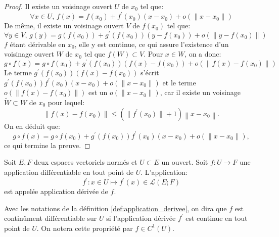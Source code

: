 \begin{proof}
  Il existe un voisinage ouvert $U$ de $x_0$ tel que:
  \begin{equation}
    \forall x \in U, \, f(x) = f(x_0) + f^\prime(x_0)\left( x-x_0 \right) + o\left( \| x - x_0 \| \right)
  \end{equation}
De même, il existe un voisinage ouvert $V$ de $f(x_0)$ tel que:
  \begin{equation}
    \forall y \in V, \, g(y) = g\left( f(x_0) \right)+ g^\prime\left( f(x_0) \right)\left( y-f(x_0) \right) + o\left( \| y - f(x_0) \| \right)
  \end{equation}
  $f$ étant dérivable en $x_0$, elle y est continue, ce qui assure l'existence d'un voisinage ouvert $W$ de $x_0$ tel que $f(W) \subset V.$ 
Pour $x \in W$, on a donc:
\begin{equation}
  g \circ f (x) = g \circ f (x_0) +g^\prime \left( f(x_0) \right)\left( f(x)-f(x_0) \right) + o\left( \| f(x) - f(x_0) \| \right)
\end{equation}
Le terme $g^\prime \left( f(x_0) \right)\left( f(x)-f(x_0) \right)$ s'écrit $g^\prime \left( f(x_0) \right)f^\prime(x_0)\left( x-x_0 \right)
+ o\left( \| x-x_0\| \right)$ et le terme $o\left( \| f(x) - f(x_0) \| \right)$ est un $o\left( \| x-x_0\| \right)$, car il existe un 
voisinage $\tilde{W} \subset W$ de $x_0$ pour lequel:
\begin{equation}
  \left \| f(x) - f(x_0)\right \| \leq \left( \|f^\prime(x_0)\| + 1 \right) \left \| x-x_0 \right \|.
\end{equation}
On en déduit que:
\begin{equation}
  g \circ f (x) = g \circ f (x_0) +g^\prime \left( f(x_0) \right)f^\prime(x_0)\left( x-x_0 \right) + o\left( \| x - x_0 \| \right),
\end{equation}
ce qui termine la preuve.
\end{proof}

\begin{fdefn}
  \label{def:application_derivee}
  Soit $E,F$ deux espaces vectoriels normés et $U \subset E$ un ouvert. Soit $f \colon U \to F$ une application
  différentiable en tout point de $U$. L'application:
  \begin{equation}
    f^\prime \colon x \in U \mapsto f^\prime(x) \in \mathcal{L}(E;F)
  \end{equation}
  est appelée application dérivée de $f$.
\end{fdefn}

\begin{fdefn}
Avec les notations de la définition \ref{def:application_derivee}, on dira que $f$ est continûment différentiable sur $U$ si 
l'application dérivée $f^\prime$ est continue en tout point de $U$. On notera cette propriété par $f \in C^1(U).$
\end{fdefn}


